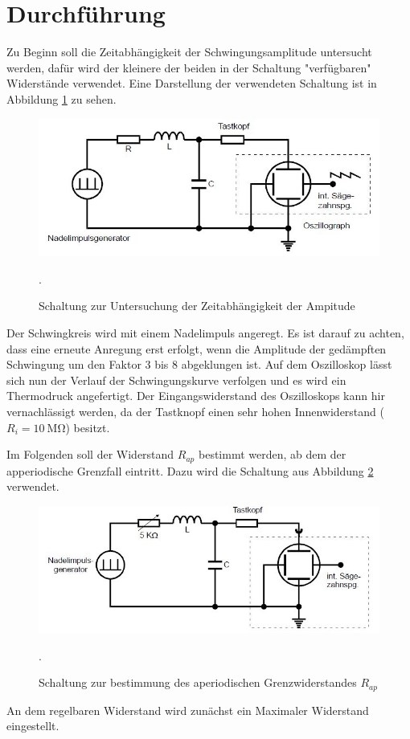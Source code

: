 \section{Durchführung}
Zu Beginn soll die Zeitabhängigkeit der Schwingungsamplitude untersucht werden, dafür
wird der kleinere der beiden in der Schaltung "verfügbaren" Widerstände verwendet.
Eine Darstellung der verwendeten Schaltung ist in Abbildung \ref{fig:a} zu sehen.
\begin{figure}[H]
  \centering
  \includegraphics[width=13cm]{a.JPG}
  \caption{Schaltung zur Untersuchung der Zeitabhängigkeit der Ampitude}
  \cite{skript}.
  \label{fig:a}
\end{figure}
Der Schwingkreis wird mit einem Nadelimpuls angeregt. Es ist darauf zu achten, dass
eine erneute Anregung erst erfolgt, wenn die Amplitude der gedämpften
Schwingung um den Faktor 3 bis 8 abgeklungen ist. Auf dem Oszilloskop lässt
sich nun der Verlauf der Schwingungskurve verfolgen und es wird ein
Thermodruck angefertigt.
Der Eingangswiderstand des Oszilloskops kann hir vernachlässigt werden, da der
Tastknopf einen sehr hohen Innenwiderstand ($R_{i}=\SI{10}{\mega\ohm}$) besitzt.

Im Folgenden soll der Widerstand $R_{ap}$ bestimmt werden, ab dem der apperiodische
Grenzfall eintritt. Dazu wird die Schaltung aus Abbildung \ref{fig:b} verwendet.
\begin{figure}[H]
  \centering
  \includegraphics[width=13cm]{b.JPG}
  \caption{Schaltung zur bestimmung des aperiodischen Grenzwiderstandes $R_{ap}$}
  \cite{skript}.
  \label{fig:b}
\end{figure}
An dem regelbaren Widerstand wird zunächst ein Maximaler Widerstand eingestellt.





\label{sec:Durchführung}
